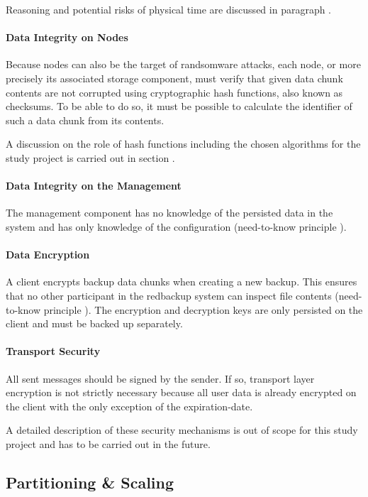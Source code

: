 Reasoning and potential risks of physical time are discussed in paragraph .

\paragraph{Data Integrity on Nodes} Because \glspl{node} can also be the target of randsomware attacks, each \gls{node}, or more precisely its associated \gls{storage} component, must verify that given data \gls{chunk} contents are not corrupted using cryptographic hash functions, also known as checksums. To be able to do so, it must be possible to calculate the identifier of such a data \gls{chunk} from its contents.

A discussion on the role of hash functions including the chosen algorithms for the study project is carried out in section .

\paragraph{Data Integrity on the Management} The \gls{management} component has no knowledge of the persisted data in the system and has only knowledge of the configuration (need-to-know principle \cite{security-patterns}).

\paragraph{Data Encryption} A \gls{client} encrypts backup data \glspl{chunk} when creating a new backup. This ensures that no other participant in the redbackup system can inspect file contents (need-to-know principle \cite{security-patterns}). The encryption and decryption keys are only persisted on the \gls{client} and must be backed up separately.

\paragraph{Transport Security} All sent \glspl{message} should be signed by the sender. If so, transport layer encryption is not strictly necessary because all user data is already encrypted on the \gls{client} with the only exception of the \gls{expiration-date}.

A detailed description of these security mechanisms is out of scope for this study project and has to be carried out in the future.

\subsection{Partitioning \& Scaling}

